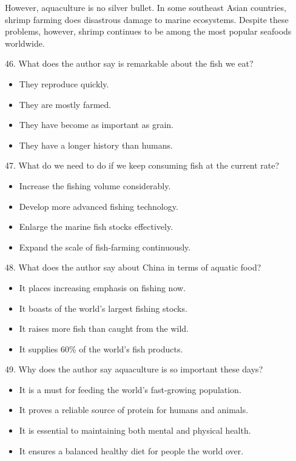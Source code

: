 \documentclass[UTF8,11pt]{ctexart}
\begin{document}
However, aquaculture is no silver bullet. In some southeast Asian countries, shrimp farming does disastrous damage to marine ecosystems. Despite these problems, however, shrimp continues to be among the most popular seafoods worldwide.


46. What does the author say is remarkable about the fish we eat?


\begin{itemize}[leftmargin=2em,itemsep=.2em,topsep=.4em]\item[A.] They reproduce quickly.
\item[B.] They are mostly farmed.
\item[C.] They have become as important as grain.
\item[D.] They have a longer history than humans.
\end{itemize}

47. What do we need to do if we keep consuming fish at the current rate?


\begin{itemize}[leftmargin=2em,itemsep=.2em,topsep=.4em]\item[A.] Increase the fishing volume considerably.
\item[B.] Develop more advanced fishing technology.
\item[C.] Enlarge the marine fish stocks effectively.
\item[D.] Expand the scale of fish-farming continuously.
\end{itemize}

48. What does the author say about China in terms of aquatic food?


\begin{itemize}[leftmargin=2em,itemsep=.2em,topsep=.4em]\item[A.] It places increasing emphasis on fishing now.
\item[B.] It boasts of the world's largest fishing stocks.
\end{itemize}

\begin{itemize}[leftmargin=2em,itemsep=.2em,topsep=.4em]\item[C.] It raises more fish than caught from the wild.
\item[D.] It supplies 60\% of the world's fish products.
\end{itemize}

49. Why does the author say aquaculture is so important these days?


\begin{itemize}[leftmargin=2em,itemsep=.2em,topsep=.4em]\item[A.] It is a must for feeding the world's fast-growing population.
\item[B.] It proves a reliable source of protein for humans and animals.
\item[C.] It is essential to maintaining both mental and physical health.
\item[D.] It ensures a balanced healthy diet for people the world over.
\end{itemize}
\end{document}
